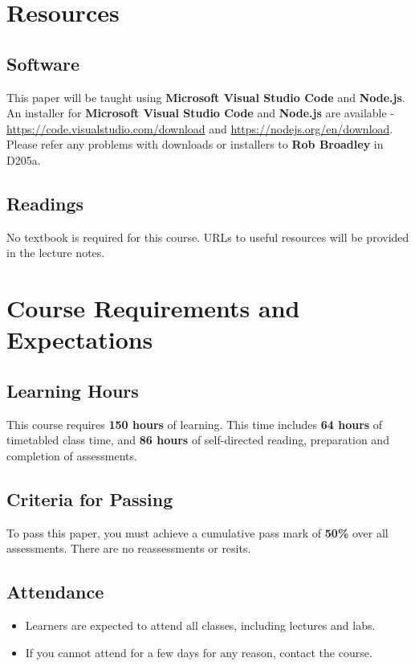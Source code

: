 \documentclass{article}
\begin{document}
\section*{Resources}

\subsection*{Software}
This paper will be taught using \textbf{Microsoft Visual Studio Code} and \textbf{Node.js}. An installer for \textbf{Microsoft Visual Studio Code} and \textbf{Node.js} are available - \href{https://code.visualstudio.com/download}{https://code.visualstudio.com/download} and \href{https://nodejs.org/en/download}{https://nodejs.org/en/download}. Please refer any problems with downloads or installers to \textbf{Rob Broadley} in D205a.

\subsection*{Readings}
No textbook is required for this course. URLs to useful resources will be provided in the lecture notes. 

\section*{Course Requirements and Expectations}

\subsection*{Learning Hours}
This course requires \textbf{150 hours} of learning. This time includes \textbf{64 hours} of timetabled class time, and \textbf{86 hours} of self-directed reading, preparation and completion of assessments.  

\subsection*{Criteria for Passing}
To pass this paper, you must achieve a cumulative pass mark of \textbf{50\%} over all assessments. There are no reassessments or resits.

\subsection*{Attendance}
\begin{itemize}
	\item Learners are expected to attend all classes, including lectures and labs.
	\item If you cannot attend for a few days for any reason, contact the course.
\end{itemize}
\end{document}
